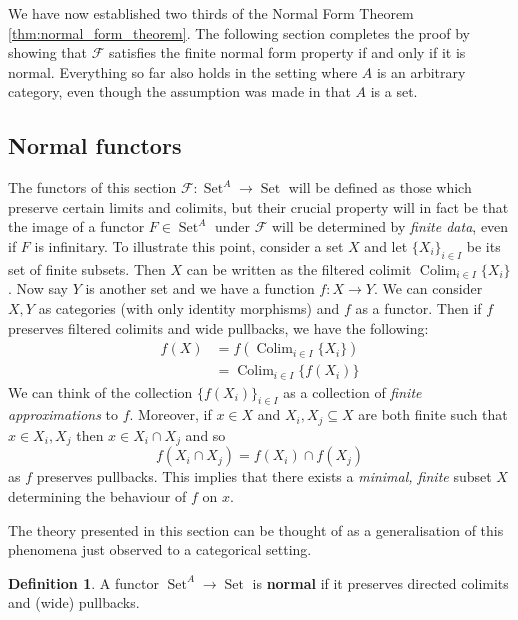 \documentclass[12pt]{article}
\theoremstyle{plain}
\theoremstyle{definition}
\newtheorem{defn}[thm]{Definition} %
\newcommand{\scr}[1]{\mathscr{#1}}
\newcommand{\lto}{\longrightarrow}
\DeclareMathOperator{\set}{Set}
\begin{document}
We have now established two thirds of the Normal Form Theorem \ref{thm:normal_form_theorem}. The following section completes the proof by showing that $\scr{F}$ satisfies the finite normal form property if and only if it is normal. Everything so far also holds in the setting where $A$ is an arbitrary category, even though the assumption was made in \cite{Girard} that $A$ is a set.
	
\subsection{Normal functors}
\label{sec:normal_functors}
The functors of this section $\scr{F}: \set^A \lto \set$ will be defined as those which preserve certain limits and colimits, but their crucial property will in fact be that the image of a functor $F \in \set^A$ under $\scr{F}$ will be determined by \emph{finite data}, even if $F$ is infinitary. To illustrate this point, consider a set $X$ and let $\{ X_i \}_{i \in I}$ be its set of finite subsets. Then $X$ can be written as the filtered colimit $\operatorname{Colim}_{i \in I}\{ X_i \}$. Now say $Y$ is another set and we have a function $f: X \lto Y$. We can consider $X,Y$ as categories (with only identity morphisms) and $f$ as a functor. Then if $f$ preserves filtered colimits and wide pullbacks, we have the following:
\begin{align*}
    f(X) &= f(\operatorname{Colim}_{i \in I}\{ X_i \})\\
    &= \operatorname{Colim}_{i \in I}\{ f(X_i) \} 
\end{align*}
We can think of the collection $\{ f(X_i) \}_{i \in I}$ as a collection of \emph{finite approximations} to $f$. Moreover, if $x \in X$ and $X_i, X_j \subseteq X$ are both finite such that $x \in X_i, X_j$ then $x \in X_i \cap X_j$ and so
\begin{equation}
f(X_i \cap X_j) = f(X_i) \cap f(X_j)
\end{equation}
as $f$ preserves pullbacks. This implies that there exists a \emph{minimal, finite} subset $X$ determining the behaviour of $f$ on $x$.

The theory presented in this section can be thought of as a generalisation of this phenomena just observed to a categorical setting.

	\begin{defn}\label{def:normal_functor}
		A functor $\set^A \lto \set$ is \textbf{normal} if it preserves directed colimits and (wide) pullbacks.
		\end{defn}
\end{document}
